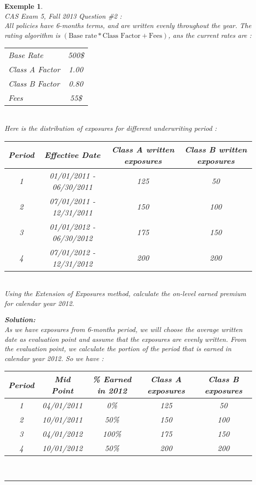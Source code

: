 \documentclass[11pt, english]{memoir}
\numberwithin{definition}{section}
\newtheorem{example}{Exemple}[section]
\newenvironment{exemple}
{
	\begin{example} \normalfont \ \\[5pt] 
	}
	{
		\hfill\rule{0.5em}{0.5em}\end{example}
}
\newenvironment{solution}
{\noindent\textbf{Solution:} \\[5pt] 
}{
}
\begin{document}
	
	\begin{exemple}
		CAS Exam 5, Fall 2013 Question \#2 :\\
		All policies have 6-months terms, and are written evenly throughout the year. The rating algorithm is $ (\text{Base rate}*\text{Class Factor} + \text{Fees}) $, ans the current rates are :
		
		\begin{tabular}{lc}
			Base Rate & 500\$ \\
			Class A Factor & 1.00 \\
			Class B Factor & 0.80 \\
			Fees & 55\$
		\end{tabular}\\
	
		Here is the distribution of exposures for different underwriting period : 
		
		\begin{tabular}{cccc}
			\toprule
			Period & Effective Date & Class A written exposures & Class B written exposures \\
			\midrule
			1 & 01/01/2011 - 06/30/2011 & 125 & 50 \\
			2 & 07/01/2011 - 12/31/2011 & 150 & 100 \\
			3 & 01/01/2012 - 06/30/2012 & 175 & 150 \\
			4 & 07/01/2012 - 12/31/2012 & 200 & 200 \\
			\bottomrule
		\end{tabular}\\
		
		Using the Extension of Exposures method, calculate the on-level earned premium for calendar year 2012.
		 
		\begin{solution}
			As we have exposures from 6-months period, we will choose the average written date as evaluation point and assume that the exposures are evenly written. From the evaluation point, we calculate the portion of the period that is earned in calendar year 2012. So we have : 
			
			\begin{tabular}{ccccc}
				\toprule
				Period & Mid Point & \% Earned in 2012 & Class A exposures & Class B exposures \\
				\midrule
				1 & 04/01/2011 & 0\% & 125 & 50 \\
				2 & 10/01/2011 & 50\% & 150 & 100 \\
				3 & 04/01/2012 & 100\% & 175 & 150 \\
				4 & 10/01/2012 & 50\% & 200 & 200 \\
				\bottomrule
			\end{tabular}\\
		

\end{solution}
\end{exemple}
\end{document}
